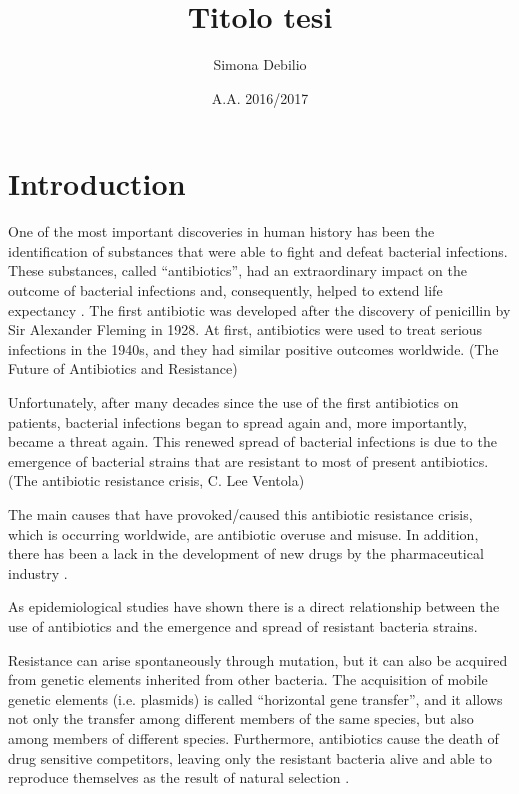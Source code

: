 \documentclass[11pt]{report}
\title{\textbf{Titolo tesi}}
\author{Simona Debilio}
\date{A.A. 2016/2017}
\begin{document}
\maketitle

\tableofcontents

\chapter{Introduction}
One of the most important discoveries in human history has been the identification of substances that were able to fight and defeat bacterial infections.
These substances, called “antibiotics”, had an extraordinary impact on the outcome of bacterial infections and, consequently, helped to extend life expectancy \cite{ventola2015antibiotic}. 
The first antibiotic was developed after the discovery of penicillin by Sir Alexander Fleming in 1928.
At first, antibiotics were used to treat serious infections in the 1940s, and they had similar positive outcomes worldwide. (The Future of Antibiotics and Resistance)

Unfortunately, after many decades since the use of the first antibiotics on patients, bacterial infections began to spread again and, more importantly, became a threat again.
This renewed spread of bacterial infections is due to the emergence of bacterial strains that are resistant to most of present antibiotics. (The antibiotic resistance crisis, C. Lee Ventola)

The main causes that have provoked/caused this antibiotic resistance crisis, which is occurring worldwide, are antibiotic overuse and misuse. In addition, there has been a lack in the development of new drugs by the pharmaceutical industry \cite{nature2013}.

As epidemiological studies have shown there is a direct relationship between the use of antibiotics and the emergence and spread of resistant bacteria strains.

Resistance can arise spontaneously through mutation, but it can also be acquired from genetic elements inherited from other bacteria. The acquisition of mobile genetic elements (i.e. plasmids) is called “horizontal gene transfer”, and it allows not only the transfer among different members of the same species, but also among members of different species.
Furthermore, antibiotics cause the death of drug sensitive competitors, leaving only the resistant bacteria alive and able to reproduce themselves as the result of natural selection \cite{doi:10.1093/emph/eou024}.
\end{document}
